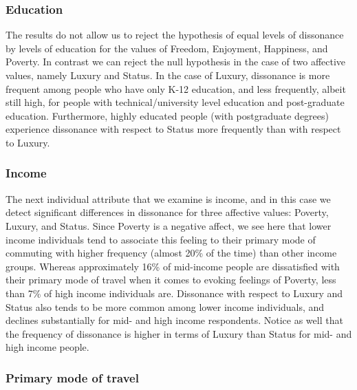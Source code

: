 \documentclass[]{elsarticle} %
\begin{document}
\hypertarget{education}{%
\subsubsection{Education}\label{education}}

The results do not allow us to reject the hypothesis of equal levels of
dissonance by levels of education for the values of Freedom, Enjoyment,
Happiness, and Poverty. In contrast we can reject the null hypothesis in
the case of two affective values, namely Luxury and Status. In the case
of Luxury, dissonance is more frequent among people who have only K-12
education, and less frequently, albeit still high, for people with
technical/university level education and post-graduate education.
Furthermore, highly educated people (with postgraduate degrees)
experience dissonance with respect to Status more frequently than with
respect to Luxury.

\hypertarget{income}{%
\subsubsection{Income}\label{income}}

The next individual attribute that we examine is income, and in this
case we detect significant differences in dissonance for three affective
values: Poverty, Luxury, and Status. Since Poverty is a negative affect,
we see here that lower income individuals tend to associate this feeling
to their primary mode of commuting with higher frequency (almost 20\% of
the time) than other income groups. Whereas approximately 16\% of
mid-income people are dissatisfied with their primary mode of travel
when it comes to evoking feelings of Poverty, less than 7\% of high
income individuals are. Dissonance with respect to Luxury and Status
also tends to be more common among lower income individuals, and
declines substantially for mid- and high income respondents. Notice as
well that the frequency of dissonance is higher in terms of Luxury than
Status for mid- and high income people.

\hypertarget{primary-mode-of-travel}{%
\subsubsection{Primary mode of travel}\label{primary-mode-of-travel}}
\end{document}
